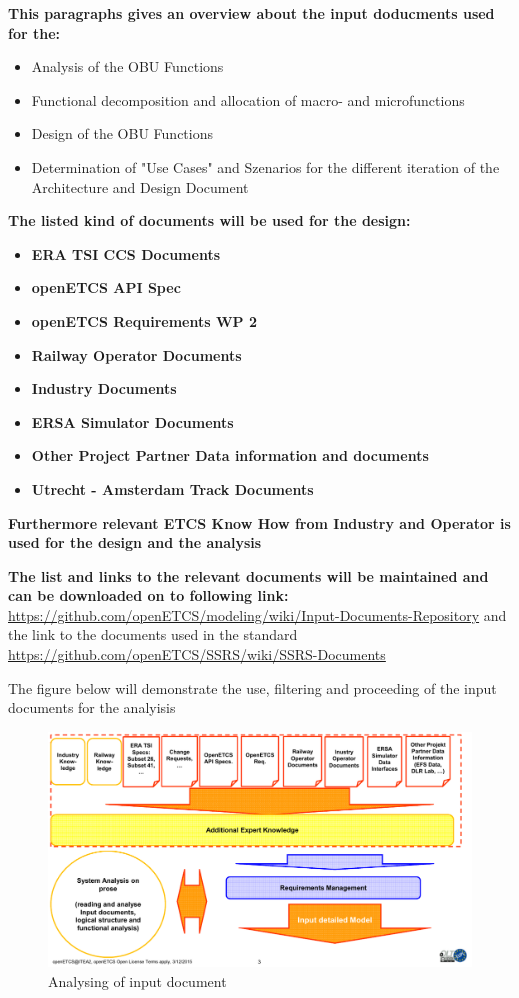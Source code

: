 \textbf{This paragraphs gives an overview about the input doducments used for the:}
\begin{itemize}
\item Analysis of the OBU Functions
\item Functional decomposition and allocation of macro- and microfunctions
\item Design of the OBU Functions
\item Determination of "Use Cases" and Szenarios for the different iteration of the Architecture and Design Document
\end{itemize} 

\textbf{The listed kind of documents will be used for the design:}

\begin{itemize}
\item\textbf{ERA TSI CCS Documents}
\item\textbf{openETCS API Spec}
\item\textbf{openETCS Requirements WP 2}
\item\textbf{Railway Operator Documents}
\item\textbf{Industry Documents}
\item\textbf{ERSA Simulator Documents}
\item\textbf{Other Project Partner Data information and documents}
\item\textbf{Utrecht - Amsterdam Track Documents}
\end{itemize}

\textbf{Furthermore relevant ETCS Know How from Industry and Operator is used for the design and the analysis}

\textbf{The list and links to the relevant documents will be maintained and can be downloaded on to following link:}
\url{https://github.com/openETCS/modeling/wiki/Input-Documents-Repository}
and the link to the documents used in the standard \url{https://github.com/openETCS/SSRS/wiki/SSRS-Documents}

The figure below will demonstrate the use, filtering and proceeding of the input documents for the analyisis\\

\begin{figure}[h]
\includegraphics[scale=0.5]{images/AnalysisDocuments}
\caption{Analysing of input document}
\label{Analyising of input document}
\end{figure}